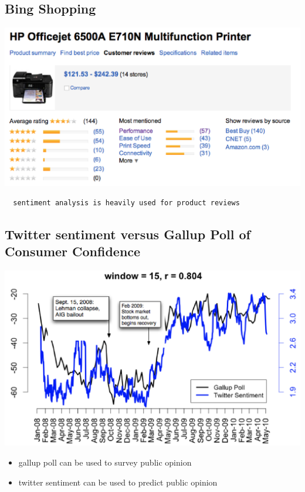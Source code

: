 \documentclass[11pt]{article}
\theoremstyle{definition}
\begin{document}
\subsection{Bing Shopping}
\includegraphics[width=\textwidth/2]{6.png}
\begin{verbatim}
  sentiment analysis is heavily used for product reviews
\end{verbatim}

\subsection{Twitter sentiment versus Gallup Poll of
Consumer Confidence}
\includegraphics[width=\textwidth/2]{7.png}
\begin{itemize}
  \item gallup poll can be used to survey public opinion
  \item twitter sentiment can be used to predict public opinion
\end{itemize}
\end{document}
